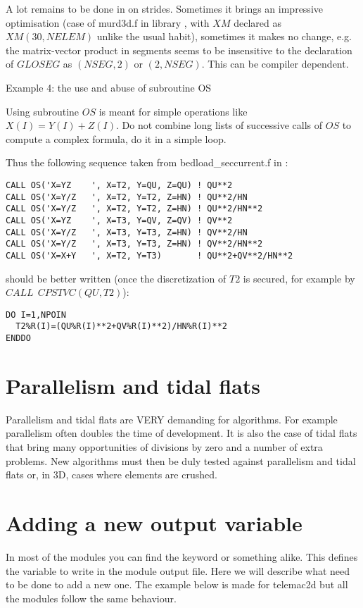 A lot remains to be done in \telemacsystem on strides. Sometimes it brings an
impressive optimisation (case of murd3d.f in library , with $XM$
declared as $XM(30,NELEM)$ unlike the usual habit), sometimes it makes no change,
e.g. the matrix-vector product in segments seems to be insensitive to the
declaration of $GLOSEG$ as $(NSEG,2)$ or $(2,NSEG)$. This can be compiler dependent.

Example 4: the use and abuse of subroutine OS

Using subroutine $OS$ is meant for simple operations like $X(I)=Y(I)+Z(I)$. Do
not combine long lists of successive calls of $OS$ to compute a complex formula,
do it in a simple loop.

Thus the following sequence taken from bedload\_seccurrent.f in \sisyphe:
\begin{lstlisting}
CALL OS('X=YZ    ', X=T2, Y=QU, Z=QU) ! QU**2
CALL OS('X=Y/Z   ', X=T2, Y=T2, Z=HN) ! QU**2/HN
CALL OS('X=Y/Z   ', X=T2, Y=T2, Z=HN) ! QU**2/HN**2
CALL OS('X=YZ    ', X=T3, Y=QV, Z=QV) ! QV**2
CALL OS('X=Y/Z   ', X=T3, Y=T3, Z=HN) ! QV**2/HN
CALL OS('X=Y/Z   ', X=T3, Y=T3, Z=HN) ! QV**2/HN**2
CALL OS('X=X+Y   ', X=T2, Y=T3)       ! QU**2+QV**2/HN**2
\end{lstlisting}
should be better written (once the discretization of $T2$ is secured, for example
by $CALL~~CPSTVC(QU, T2)$):
\begin{lstlisting}
DO I=1,NPOIN
  T2%R(I)=(QU%R(I)**2+QV%R(I)**2)/HN%R(I)**2
ENDDO
\end{lstlisting}

\section{Parallelism and tidal flats}

Parallelism and tidal flats are VERY demanding for algorithms. For example
parallelism often doubles the time of development. It is also the case of tidal
flats that bring many opportunities of divisions by zero and a number of extra
problems. New algorithms must then be duly tested against parallelism and tidal
flats or, in 3D, cases where elements are crushed.
%

\section{Adding a new output variable}

In most of the modules you can find the keyword  or something alike.  This defines the variable to write in the module
output file. Here we will describe what need to be done to add a new one. The
example below is made for telemac2d but all the modules follow the same
behaviour.

